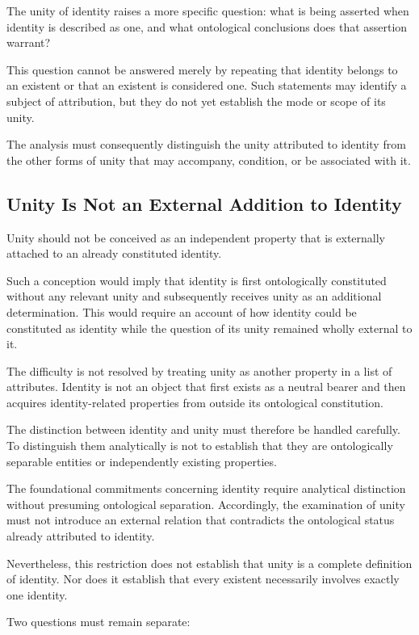 The unity of identity raises a more specific question:
what is being asserted when identity is described
as one, and what ontological conclusions does that
assertion warrant?

This question cannot be answered merely by repeating
that identity belongs to an existent or that an existent
is considered one. Such statements may identify a
subject of attribution, but they do not yet establish
the mode or scope of its unity.

The analysis must consequently distinguish the unity
attributed to identity from the other forms of unity
that may accompany, condition, or be associated with it.

\subsection{Unity Is Not an External Addition to Identity}

Unity should not be conceived as an independent
property that is externally attached to an already
constituted identity.

Such a conception would imply that identity is first
ontologically constituted without any relevant unity
and subsequently receives unity as an additional
determination. This would require an account of how
identity could be constituted as identity while the
question of its unity remained wholly external to it.

The difficulty is not resolved by treating unity
as another property in a list of attributes. Identity
is not an object that first exists as a neutral bearer
and then acquires identity-related properties from
outside its ontological constitution.

The distinction between identity and unity must
therefore be handled carefully. To distinguish them
analytically is not to establish that they are
ontologically separable entities or independently
existing properties.

The foundational commitments concerning identity
require analytical distinction without presuming
ontological separation. Accordingly, the examination
of unity must not introduce an external relation
that contradicts the ontological status already
attributed to identity.

Nevertheless, this restriction does not establish
that unity is a complete definition of identity.
Nor does it establish that every existent necessarily
involves exactly one identity.

Two questions must remain separate:

